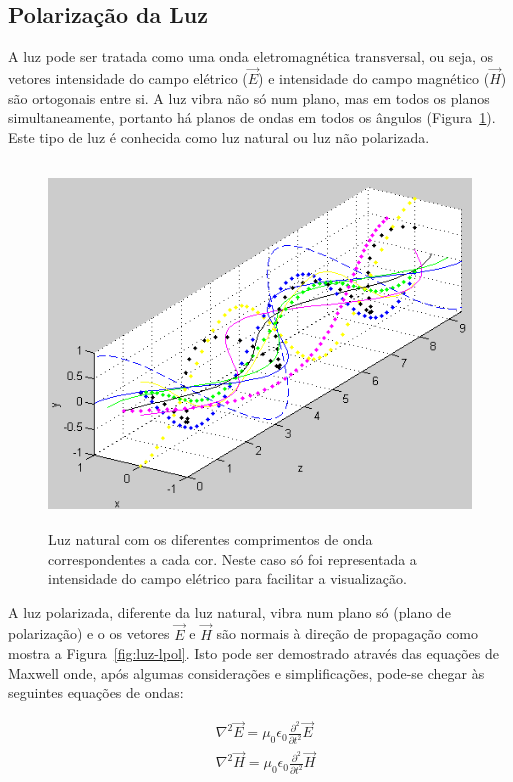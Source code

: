 \subsection{Polarização da Luz}

A luz pode ser tratada como uma onda eletromagnética transversal, ou
seja, os vetores intensidade do campo elétrico ($\vec{E}$) e
intensidade do campo magnético ($\vec{H}$) são ortogonais entre si. A
luz vibra não só num plano, mas em todos os planos simultaneamente,
portanto há planos de ondas em todos os ângulos
(Figura~\ref{fig:luz-nat}). Este tipo de luz é conhecida como luz
natural ou luz não polarizada.\cite{66}

\begin{figure} [h]
  \begin{center}
    \includegraphics[height=273pt,width=350pt]{images/fig_luz-nat}
    \caption{Luz natural com os diferentes comprimentos de onda
      correspondentes a cada cor. Neste caso só foi representada a
      intensidade do campo elétrico para facilitar a
      visualização.\cite{67}}\label{fig:luz-nat}
  \end{center}
\end{figure}
 
A luz polarizada, diferente da luz natural, vibra num plano só (plano
de polarização) e o os vetores $\vec{E}$ e $\vec{H}$ são normais à
direção de propagação como mostra a Figura~\ref{fig:luz-lpol}. Isto
pode ser demostrado através das equações de Maxwell onde, após algumas
considerações e simplificações, pode-se chegar às seguintes equações
de ondas:

\begin{align}
 &\nabla^2 \vec{E}  = \mu_{0}\epsilon_{0}\frac{\partial^2}{\partial t^{2}}\vec{E}\label{eq-incampele}\\
 &\nabla^2 \vec{H}  = \mu_{0}\epsilon_{0}\frac{\partial^2}{\partial t^{2}}\vec{H}\label{eq-incampmag}
\end{align}

